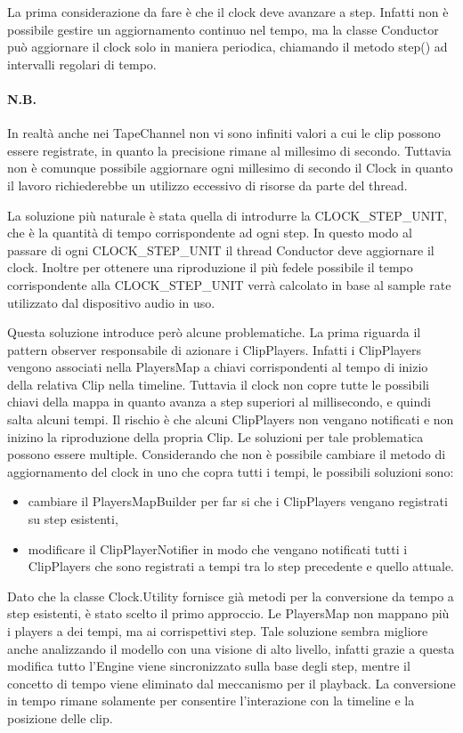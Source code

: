 \documentclass[a4paper,12pt]{report}
\begin{document}
La prima considerazione da fare è che il clock deve avanzare a step. Infatti non è possibile gestire un aggiornamento continuo nel tempo, ma la classe Conductor può aggiornare il clock solo in maniera periodica, chiamando il metodo step() ad intervalli regolari di tempo.
\paragraph{N.B.}
In realtà anche nei TapeChannel non vi sono infiniti valori a cui le clip possono essere registrate, in quanto la precisione rimane al millesimo di secondo. Tuttavia non è comunque possibile aggiornare ogni millesimo di secondo il Clock in quanto il lavoro richiederebbe un utilizzo eccessivo di risorse da parte del thread.
\parskip 0.2in

La soluzione più naturale è stata quella di introdurre la CLOCK\_STEP\_UNIT, che è la quantità di tempo corrispondente ad ogni step. In questo modo al passare di ogni CLOCK\_STEP\_UNIT il thread Conductor deve aggiornare il clock.
Inoltre per ottenere una riproduzione il più fedele possibile il tempo corrispondente alla CLOCK\_STEP\_UNIT verrà calcolato in base al sample rate utilizzato dal dispositivo audio in uso.
\parskip 0in

Questa soluzione introduce però alcune problematiche. La prima riguarda il pattern observer responsabile di azionare i ClipPlayers. Infatti i ClipPlayers vengono associati nella PlayersMap a chiavi corrispondenti al tempo di inizio della relativa Clip nella timeline. Tuttavia il clock non copre tutte le possibili chiavi della mappa in quanto avanza a step superiori al millisecondo, e quindi salta alcuni tempi.
Il rischio è che alcuni ClipPlayers non vengano notificati e non inizino la riproduzione della propria Clip.
Le soluzioni per tale problematica possono essere multiple. Considerando che non è possibile cambiare il metodo di aggiornamento del clock in uno che copra tutti i tempi, le possibili soluzioni sono: 
\begin{itemize}
    \item cambiare il PlayersMapBuilder per far si che i ClipPlayers vengano registrati su step esistenti,
    \item modificare il ClipPlayerNotifier in modo che vengano notificati tutti i ClipPlayers che sono registrati a tempi tra lo step precedente e quello attuale.
\end{itemize}
Dato che la classe Clock.Utility fornisce già metodi per la conversione da tempo a step esistenti, è stato scelto il primo approccio. Le PlayersMap non mappano più i players a dei tempi, ma ai corrispettivi step.
Tale soluzione sembra migliore anche analizzando il modello con una visione di alto livello, infatti grazie a questa modifica tutto l’Engine viene sincronizzato sulla base degli step, mentre il concetto di tempo viene eliminato dal meccanismo per il playback. La conversione in tempo rimane solamente per consentire l'interazione con la timeline e la posizione delle clip.
\end{document}
